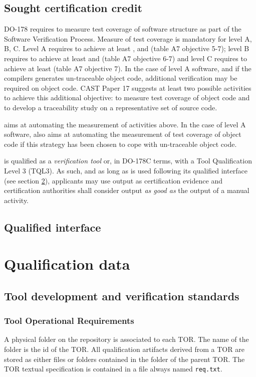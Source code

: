 \documentclass {report}
\begin{document}
\section {Sought certification credit}
DO-178 requires to measure test coverage of software structure as part of the Software Verification Process. Measure of test coverage is mandatory for level A, B, C. Level A requires to achieve at least \mcdc, \dc and \stc (table A7 objective 5-7); level B requires to achieve at least \dc and \stc (table A7 objective 6-7) and level C requires to achieve at least \stc (table A7 objective 7). In the case of level A software, and if the compilers generates un-traceable object code, additional verification may be required on object code. CAST Paper 17 suggests at least two possible activities to achieve this additional objective: to measure test coverage of object code and to develop a traceability study on a representative set of source code.

\xcov aims at automating the measurement of activities above. In the case of level A software, \xcov also aims at automating the measurement of test coverage of object code if this strategy has been chosen to cope with un-traceable object code.

\xcov is qualified as a \emph{verification tool} or, in DO-178C terms, with a Tool Qualification Level 3 (TQL3). As such, and as long as \xcov is used following its qualified interface (see section \ref{sec:qual-interface}), applicants may use \xcov output as certification evidence and certification authorities shall consider \xcov output \emph{as good as} the output of a manual activity.

\section{Qualified interface}
\label{sec:qual-interface}

\chapter{Qualification data}

\section{Tool development and verification standards}
\subsection{Tool Operational Requirements}
A physical folder on the repository is associated to each TOR. The name of the folder is the id of the TOR. All qualification artifacts derived from a TOR are stored as either files or folders contained in the folder of the parent TOR. The TOR textual specification is contained in a file always named \texttt{req.txt}.
\end{document}
